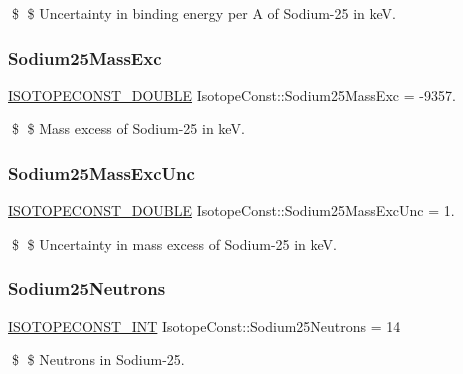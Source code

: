 \$ \$ Uncertainty in binding energy per A of Sodium-\/25 in keV. \mbox{\label{group___isotope_const-_sodium-_na25_gae336923a7cc0055e0e61653491698db6}} 
\subsubsection{\texorpdfstring{Sodium25\+Mass\+Exc}{Sodium25MassExc}}
{\footnotesize\ttfamily \mbox{\hyperlink{group___isotope_const-_macros_ga8f45a7272ce02c0b4c65c44636ed719a}{I\+S\+O\+T\+O\+P\+E\+C\+O\+N\+S\+T\+\_\+\+D\+O\+U\+B\+LE}} Isotope\+Const\+::\+Sodium25\+Mass\+Exc = -\/9357.}

\$ \$ Mass excess of Sodium-\/25 in keV. \mbox{\label{group___isotope_const-_sodium-_na25_gaf6b70f0e93254a038c5cce72c4a6b95a}} 
\subsubsection{\texorpdfstring{Sodium25\+Mass\+Exc\+Unc}{Sodium25MassExcUnc}}
{\footnotesize\ttfamily \mbox{\hyperlink{group___isotope_const-_macros_ga8f45a7272ce02c0b4c65c44636ed719a}{I\+S\+O\+T\+O\+P\+E\+C\+O\+N\+S\+T\+\_\+\+D\+O\+U\+B\+LE}} Isotope\+Const\+::\+Sodium25\+Mass\+Exc\+Unc = 1.}

\$ \$ Uncertainty in mass excess of Sodium-\/25 in keV. \mbox{\label{group___isotope_const-_sodium-_na25_ga27de94030007ce4dc3afc575d3c74985}} 
\subsubsection{\texorpdfstring{Sodium25\+Neutrons}{Sodium25Neutrons}}
{\footnotesize\ttfamily \mbox{\hyperlink{group___isotope_const-_macros_ga5f18360b3e99483a35c32d789e62621c}{I\+S\+O\+T\+O\+P\+E\+C\+O\+N\+S\+T\+\_\+\+I\+NT}} Isotope\+Const\+::\+Sodium25\+Neutrons = 14}

\$ \$ Neutrons in Sodium-\/25. \mbox{\label{group___isotope_const-_sodium-_na25_ga28004704fb688e5b7dcb42d4f1caa895}} 
